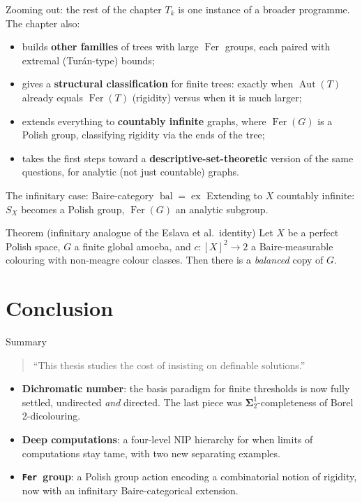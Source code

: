 \documentclass[aspectratio=169]{beamer}
\DeclareMathOperator{\Fer}{Fer}
\DeclareMathOperator{\Aut}{Aut}
\DeclareMathOperator{\bal}{bal}
\DeclareMathOperator{\ex}{ex}
\newcommand{\tFer}{\texttt{Fer}\ }
\begin{document}
\begin{frame}{Zooming out: the rest of the chapter}
  $T_k$ is one instance of a broader programme. The chapter also:
  \begin{itemize}
    \item builds \textbf{other families} of trees with large $\Fer$ groups, each paired with extremal (Tur\'an-type) bounds;
    \item gives a \textbf{structural classification} for finite trees: exactly when $\Aut(T)$ already equals $\Fer(T)$ (rigidity) versus when it is much larger;
    \item extends everything to \textbf{countably infinite} graphs, where $\Fer(G)$ is a Polish group, classifying rigidity via the ends of the tree;
    \item takes the first steps toward a \textbf{descriptive-set-theoretic} version of the same questions, for analytic (not just countable) graphs.
  \end{itemize}
\end{frame}

\begin{frame}{The infinitary case: Baire-category \texorpdfstring{$\bal=\ex$}{bal=ex}}
  Extending to $X$ countably infinite: $S_X$ becomes a Polish group, $\Fer(G)$ an analytic subgroup.
  \begin{block}{Theorem (infinitary analogue of the Eslava et al.\ identity)}
    Let $X$ be a perfect Polish space, $G$ a finite global amoeba, and $c\colon[X]^2\to 2$ a Baire-measurable colouring with non-meagre colour classes. Then there is a \emph{balanced} copy of $G$.
  \end{block}
\end{frame}

\section{Conclusion}

\begin{frame}{Summary}
  \begin{quote}
    ``This thesis studies the cost of insisting on definable solutions.''
  \end{quote}
  \begin{itemize}
    \item \textbf{Dichromatic number}: the basis paradigm for finite thresholds is now fully settled, undirected \emph{and} directed. The last piece was $\mathbf\Sigma^1_2$-completeness of Borel 2-dicolouring.
    \item \textbf{Deep computations}: a four-level NIP hierarchy for when limits of computations stay tame, with two new separating examples.
    \item \textbf{\tFer group}: a Polish group action encoding a combinatorial notion of rigidity, now with an infinitary Baire-categorical extension.
  \end{itemize}
\end{frame}
\end{document}
